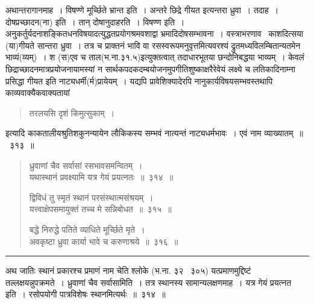 \documentclass[11pt, openany]{book}
\begin{document}
अथान्तरागानमाह~। {\qtt विषण्णे मूर्च्छिते भ्रान्त} इति~। अन्तरे छिद्रे गीयत इत्यन्तरा {\qtt ध्रुवा}~। तदाह~। दोषप्रच्छादन(ना) इति~। तान् दोषानुदाहरति~। {\qtt विषण्ण} इति~। अनु्कर्तुर्यदनाशङ्कितधनविषयादत्युद्धतप्रयोगश्रमवशाद्वा भ्रमादिदोषसम्भावना~। वस्त्राभरणाव \textendash\ काशदित्सया (या)गीयते सान्तरा ध्रुवा~। तत्र च प्राक्तनं भावि वा रसस्वरूपमनुवृत्तमित्यवरश्यं द्रुतमध्यविलम्बितान्यतमेन भाव्यं(व्यम्)~। श (स)एव च ताल(भ.ना.३१.५)इत्युक्तत्वात् तदाधारभूतया छन्दोनिबद्धया भाव्यम्~। केवलं छिद्राच्छादनमात्रप्रयोजनायामस्यां न सार्थकपदकदम्बयोजनमुपगीतिशुष्काक्षरैरेवेयं लक्ष्ये च लतिकादिनाम्ना प्रसिद्धा गीयत इति नाट्यधर्मी(र्म)प्रायेयम्~। यद्यपि प्रावेशिक्यादेरपि नानुकार्यविषयसम्भवस्तथापि काव्यवाक्यैकवाक्यतायां

\begin{quote}
{\qt तरलयसि दृशं किमुत्सुकाम्~।}
\end{quote}

\noindent
इत्यादि काकतालीयश्रुतिशकुनन्यायेन लौकिकस्य सम्भवं नात्यन्तं नाट्यधर्मभावः~। एवं नाम व्याख्यातम्~॥~३१३~॥

\newpage

\begin{quote}
{\na ध्रुवाणां चैव सर्वासां रसभावसमन्वितम्~।\\
 यथास्थानं प्रवक्ष्यामि यत्र गेयं प्रयत्नतः~॥~३१४~॥

 द्विविधं तु स्मृतं स्थानं परसंस्थात्मसंश्रयम्~।\\
 यत्त्वाक्षेपसमायुक्तं तच्च मे सन्निबोधत~॥~३१५~॥

 बद्धे निरुद्धे पतिते व्याधिते मूर्च्छिते मृते~। \\
 अवकृष्टा ध्रुवा कार्या भावे च करुणाश्रये~॥~३१६~॥}
\end{quote}
 
\hrule

\vspace{2mm}
अथ {\qtt जातिः स्थानं प्रकारश्च प्रमाणं नाम} चेति श्लोके (भ.ना. ३२ \textendash\ ३०५) यत्प्रमाणमुद्दिष्टं तल्लक्षयन्नुपक्रमते~। {\qtt ध्रुवाणां चैव सर्वासा}मिति~। तत्र स्थानस्य सामान्यलक्षणमाह~। {\qtt यत्र गेयं प्रयत्नत} इति~। रसोपयोगी पात्रविशेषः स्थानमित्यर्थः~॥~३१४~॥\\
\end{document}
